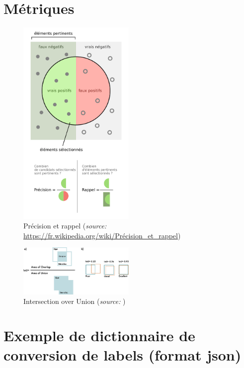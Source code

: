 \chapter{Métriques}

\begin{figure}[h]
    \label{precision_recall}
    \centering
    \includegraphics[width=0.5\textwidth]{./img/precision_recall.png}
    \caption{Précision et rappel (\textit{source:} \url{https://fr.wikipedia.org/wiki/Précision_et_rappel})}
\end{figure}

\begin{figure}[h]
    \label{iou}
    \centering
    \includegraphics[width=0.5\textwidth]{./img/iou.png}
    \caption{Intersection over Union (\textit{source:}
    \cite{Terven_Cordova-Esparza_Ramirez-Pedraza_Chavez-Urbiola_2023})}
\end{figure}

\pagebreak

\chapter{Exemple de dictionnaire de conversion de labels (format json)}

